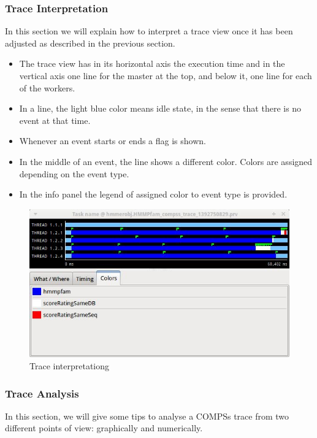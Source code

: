 \subsubsection{Trace Interpretation}
In this section we will explain how to interpret a trace view once it has been adjusted as 
described in the previous section.

\begin{itemize}
 \item The trace view has in its horizontal axis the execution time and in the vertical 
       axis one line for the master at the top, and below it, one line for each of the workers.
 \item In a line, the light blue color means idle state, in the sense that there is no event at that time.
 \item Whenever an event starts or ends a flag is shown.
 \item In the middle of an event, the line shows a different color. Colors are assigned depending on the event type.
 \item In the info panel the legend of assigned color to event type is provided.
\end{itemize}

\begin{figure}[ht!]
  \centering
    \includegraphics[width=1.0\textwidth]{./Sections/4_Tools/Figures/7.jpeg}
    \caption{Trace interpretationg}
\end{figure}


\subsubsection{Trace Analysis}
In this section, we will give some tips to analyse a COMPSs trace from two different points of view:
graphically and numerically.

